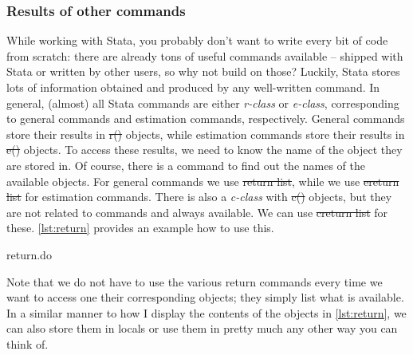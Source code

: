 \subsubsection{Results of other commands}
While working with Stata,
you probably don't want to write every bit of code from scratch:
there are already tons of useful commands available -- shipped with Stata or written by other users, so why not build on those?
Luckily,
Stata stores lots of information obtained and produced by any well-written command.
In general, (almost) all Stata commands are either \emph{r-class} or \emph{e-class},
corresponding to general commands and estimation commands, respectively.
General commands store their results in \st{r()} objects,
while estimation commands store their results in \st{e()} objects.
To access these results, we need to know the name of the object they are stored in.
Of course, there is a command to find out the names of the available objects.
For general commands we use \st{return list}, while we use \st{ereturn list} for estimation commands.
There is also a \emph{c-class} with \st{c()} objects,
but they are not related to commands and always available.
We can use \st{creturn list} for these.
\cref{lst:return} provides an example how to use this.

\begin{listing}[tbp]
    \caption{return.do}\label{lst:return}
\end{listing}

Note that we do not have to use the various return commands every time we want to access one their corresponding objects;
they simply list what is available.
In a similar manner to how I display the contents of the objects in \cref{lst:return},
we can also store them in locals or use them in pretty much any other way you can think of.
